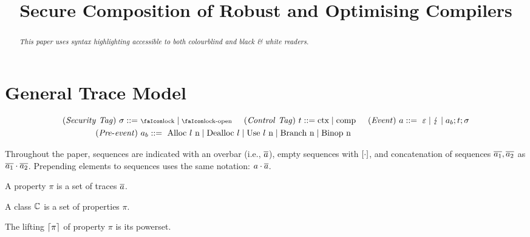 \documentclass[utf8,acmsmall,review,screen,dvipsnames]{acmart}
\begin{document}
\title{Secure Composition of Robust and Optimising Compilers}
\begin{abstract}
\begin{center}\small\it
	{This paper uses syntax highlighting accessible to both colourblind and black \& white readers.
	}
\end{center}
\end{abstract}

\maketitle

\appendix

\section{General Trace Model}\label{ap:sec:gtm}

\begin{gather*}
  \begin{aligned}
  \mi{(Security\ Tag)}~\sigma\bnfdef&\ \lock \mid \unlock\hspace{0.5cm}
  \mi{(Control\ Tag)}~\sandboxtag\bnfdef \ctx\mid\comp\hspace{0.5cm}
  \mi{(Event)}~\event\bnfdef\ \emptyevent \mid \lightning \mid \event[_{b}];\sandboxtag;\sigma \\
  \mi{(Pre\text{-}event)}&~\event[_{b}]\bnfdef\ \ev{Alloc\ \loc\ n} \mid \ev{Dealloc\ \loc} \mid \ev{Use\ \loc\ n} \mid \ev{Branch\ n} \mid \ev{Binop\ n} \\
  \end{aligned}
\end{gather*}

Throughout the paper, sequences are indicated with an overbar (i.e., $\trace$), empty sequences with $\hole{\cdot}$, and concatenation of sequences $\trace[_{1}],\trace[_{2}]$ as $\trace[_{1}]\cdot\trace[_{2}]$.
Prepending elements to sequences uses the same notation: $\event\cdot\trace$.

\begin{definition}\label{ap:def:property}
  A property $\pi$ is a set of traces $\trace$.
\end{definition}
\begin{definition}\label{ap:def:propclass}
  A class $\class$ is a set of properties $\pi$.
\end{definition}
\begin{definition}\label{ap:def:lifting:properties}
  The lifting $\lift{\pi}$ of property $\pi$ is its powerset.
\end{definition}
\end{document}
